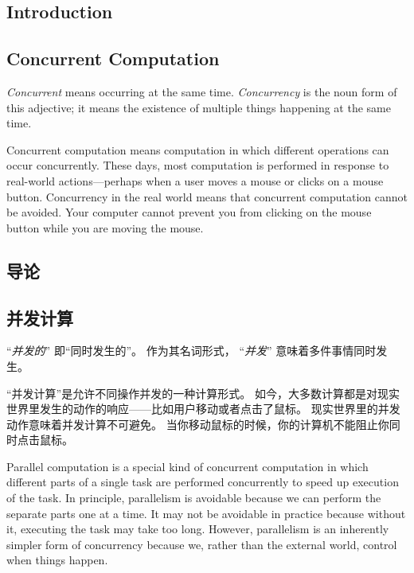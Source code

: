 \begin{en}
\section{Introduction}

\subsection{Concurrent Computation}

\emph{Concurrent} 
means occurring at the same time.
\emph{Concurrency} 
is the noun form of this adjective; it means the
existence of multiple things happening at the same time.

Concurrent computation means computation in which different operations
can occur concurrently.  These days, most computation is performed in
response to real-world actions---perhaps when a user moves a mouse or
clicks on a mouse button.  Concurrency in the real world means that
concurrent computation cannot be avoided.  Your computer cannot
prevent you from clicking on the mouse button while you are moving the
mouse.
\end{en}

\begin{ch}
\section{导论}

\subsection{并发计算}

 ``\emph{并发的}'' 即``同时发生的''。
作为其名词形式，
 ``\emph{并发}'' 意味着多件事情同时发生。

``并发计算''是允许不同操作并发的一种计算形式。
如今，大多数计算都是对现实世界里发生的动作的响应——比如用户移动或者点击了鼠标。
现实世界里的并发动作意味着并发计算不可避免。
当你移动鼠标的时候，你的计算机不能阻止你同时点击鼠标。
\end{ch}

\begin{en}
Parallel computation is a special kind of concurrent computation in
which different parts of a single task are performed concurrently to
speed up execution of the task.  In principle, parallelism is
avoidable because we can perform the separate parts one at a time.  It
may not be avoidable in practice because without it, executing the
task may take too long.  However, parallelism is an inherently simpler
form of concurrency because we, rather than the external world,
control when things happen.
\end{en}

